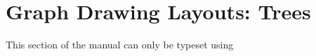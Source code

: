 %
%
%


\section{Graph Drawing Layouts: Trees}
\label{section-first-graphdrawing-library-in-manual}
\label{section-library-graphdrawing-trees}

{ }

\ifluatex
\else
    This section of the manual can only be typeset using 
    \expandafter\endinput
\fi

\includeluadocumentationof{pgf.gd.trees.library}


\subsection{The Tree Layouts}

\includeluadocumentationof{pgf.gd.trees.ReingoldTilford1981}

\includeluadocumentationof{pgf.gd.trees.ChildSpec}
\includeluadocumentationof{pgf.gd.trees.SpanningTreeComputation}


